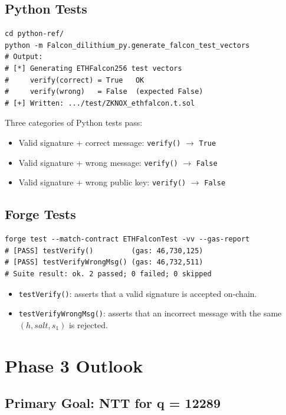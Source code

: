 \documentclass[11pt,a4paper]{article}
\begin{document}
\subsection{Python Tests}

\begin{lstlisting}[style=bash]
cd python-ref/
python -m Falcon_dilithium_py.generate_falcon_test_vectors
# Output:
# [*] Generating ETHFalcon256 test vectors
#     verify(correct) = True   OK
#     verify(wrong)   = False  (expected False)
# [+] Written: .../test/ZKNOX_ethfalcon.t.sol
\end{lstlisting}

Three categories of Python tests pass:
\begin{itemize}
  \item Valid signature + correct message: \texttt{verify()} $\rightarrow$ \texttt{True}
  \item Valid signature + wrong message: \texttt{verify()} $\rightarrow$ \texttt{False}
  \item Valid signature + wrong public key: \texttt{verify()} $\rightarrow$ \texttt{False}
\end{itemize}

\subsection{Forge Tests}

\begin{lstlisting}[style=bash]
forge test --match-contract ETHFalconTest -vv --gas-report
# [PASS] testVerify()         (gas: 46,730,125)
# [PASS] testVerifyWrongMsg() (gas: 46,732,511)
# Suite result: ok. 2 passed; 0 failed; 0 skipped
\end{lstlisting}

\begin{itemize}
  \item \texttt{testVerify()}: asserts that a valid signature is accepted on-chain.
  \item \texttt{testVerifyWrongMsg()}: asserts that an incorrect message
        with the same $(h, salt, s_1)$ is rejected.
\end{itemize}

\section{Phase 3 Outlook}

\subsection{Primary Goal: NTT for q = 12289}
\end{document}
